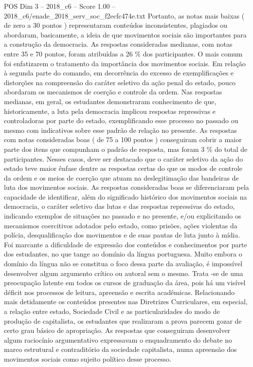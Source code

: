\begin{textsample}{POS Dim 3 – 2018\_c6 – Score 1.00 – 2018\_c6/enade\_2018\_serv\_soc\_f2ecfc474e.txt}
Portanto, as notas mais baixas ( de zero a 30 pontos ) representaram conteúdos inconsistentes, plagiados ou abordaram, basicamente, a ideia de que movimentos sociais são importantes para a construção da democracia.
As respostas consideradas medianas, com notas entre 35 e 70 pontos, foram atribuídas a 26 \% dos participantes.
O mais comum foi enfatizarem o tratamento da importância dos movimentos sociais.
Em relação à segunda parte do comando, em decorrência do excesso de exemplificações e distorções na compreensão do caráter seletivo da ação penal do estado, pouco abordaram os mecanismos de coerção e controle da ordem.
Nas respostas medianas, em geral, os estudantes demonstraram conhecimento de que, historicamente, a luta pela democracia implicou respostas repressivas e controladoras por parte do estado, exemplificando esse processo no passado ou mesmo com indicativos sobre esse padrão de relação no presente.
As respostas com notas consideradas boas ( de 75 a 100 pontos ) conseguiram cobrir a maior parte dos itens que compunham o padrão de resposta, mas foram 3 \% do total de participantes.
Nesses casos, deve ser destacado que o caráter seletivo da ação do estado teve maior ênfase dentre as respostas certas do que os modos de controle da ordem e os meios de coerção que atuam na deslegitimação das bandeiras de luta dos movimentos sociais.
As respostas consideradas boas se diferenciaram pela capacidade de identificar, além do significado histórico dos movimentos sociais na democracia, o caráter seletivo das lutas e das respostas repressivas do estado, indicando exemplos de situações no passado e no presente, e/ou explicitando os mecanismos coercitivos adotados pelo estado, como prisões, ações violentas da polícia, desqualificação dos movimentos e de suas pautas de luta junto à mídia.
Foi marcante a dificuldade de expressão dos conteúdos e conhecimentos por parte dos estudantes, no que tange ao domínio da língua portuguesa.
Muito embora o domínio da língua não se constitua o foco dessa parte da avaliação, é impossível desenvolver algum argumento crítico ou autoral sem o mesmo.
Trata -se de uma preocupação latente em todos os cursos de graduação da área, pois há um visível déficit nos processos de leitura, apreensão e escrita acadêmicas.
Relacionando mais detidamente os conteúdos presentes nas Diretrizes Curriculares, em especial, a relação entre estado, Sociedade Civil e as particularidades do modo de produção de capitalista, os estudantes que realizaram a prova parecem gozar de certo grau básico de apropriação.
As respostas que conseguiram desenvolver algum raciocínio argumentativo expressavam o enquadramento do debate no marco estrutural e contraditório da sociedade capitalista, numa apreensão dos movimentos sociais como sujeito político desse processo.

\end{textsample}
